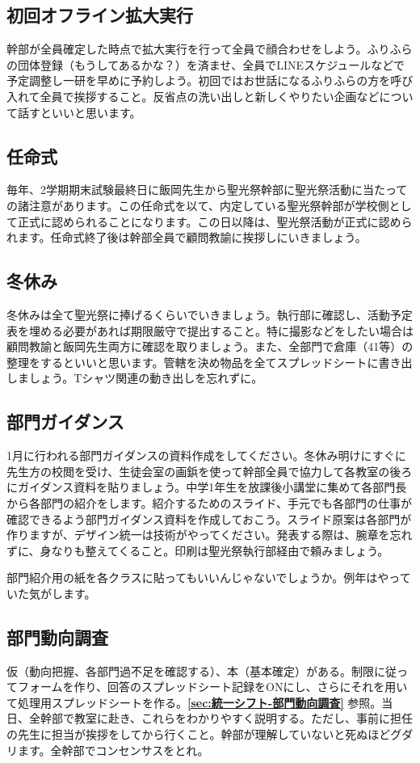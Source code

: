 \documentclass[dvipdfmx,jb5]{jarticle}
\begin{document}
\subsection{初回オフライン拡大実行}
幹部が全員確定した時点で拡大実行を行って全員で顔合わせをしよう。ふりふらの団体登録（もうしてあるかな？）を済ませ、全員でLINEスケジュールなどで予定調整し一研を早めに予約しよう。初回ではお世話になるふりふらの方を呼び入れて全員で挨拶すること。反省点の洗い出しと新しくやりたい企画などについて話すといいと思います。

\subsection{任命式}
毎年、2学期期末試験最終日に飯岡先生から聖光祭幹部に聖光祭活動に当たっての諸注意があります。この任命式を以て、内定している聖光祭幹部が学校側として正式に認められることになります。この日以降は、聖光祭活動が正式に認められます。任命式終了後は幹部全員で顧問教諭に挨拶しにいきましょう。

\subsection{冬休み}
冬休みは全て聖光祭に捧げるくらいでいきましょう。執行部に確認し、活動予定表を埋める必要があれば期限厳守で提出すること。特に撮影などをしたい場合は顧問教諭と飯岡先生両方に確認を取りましょう。また、全部門で倉庫（41等）の整理をするといいと思います。管轄を決め物品を全てスプレッドシートに書き出しましょう。Tシャツ関連の動き出しを忘れずに。

\subsection{部門ガイダンス}
1月に行われる部門ガイダンスの資料作成をしてください。冬休み明けにすぐに先生方の校閲を受け、生徒会室の画鋲を使って幹部全員で協力して各教室の後ろにガイダンス資料を貼りましょう。中学1年生を放課後小講堂に集めて各部門長から各部門の紹介をします。紹介するためのスライド、手元でも各部門の仕事が確認できるよう部門ガイダンス資料を作成しておこう。スライド原案は各部門が作りますが、デザイン統一は技術がやってください。発表する際は、腕章を忘れずに、身なりも整えてくること。印刷は聖光祭執行部経由で頼みましょう。

部門紹介用の紙を各クラスに貼ってもいいんじゃないでしょうか。例年はやっていた気がします。


\subsection{部門動向調査}
仮（動向把握、各部門過不足を確認する）、本（基本確定）がある。制限に従ってフォームを作り、回答のスプレッドシート記録をONにし、さらにそれを用いて処理用スプレッドシートを作る。{\bf \ref{sec:統一シフト-部門動向調査}} 参照。当日、全幹部で教室に赴き、これらをわかりやすく説明する。ただし、事前に担任の先生に担当が挨拶をしてから行くこと。幹部が理解していないと死ぬほどグダリます。全幹部でコンセンサスをとれ。
\end{document}
